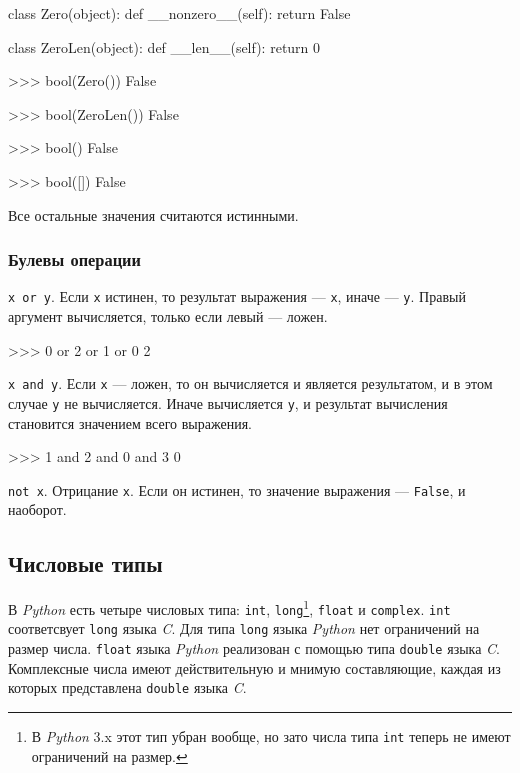 \begin{pylst}{}{}
class Zero(object):
    def __nonzero__(self):
        return False

class ZeroLen(object):
    def __len__(self):
        return 0

>>> bool(Zero())
False

>>> bool(ZeroLen())
False

>>> bool({})
False

>>> bool([])
False
\end{pylst}

Все остальные значения считаются истинными.

\subsubsection{Булевы операции}

\lstinline{x or y}. Если \lstinline{x} истинен, то результат выражения — \lstinline{x}, иначе — \lstinline{y}. Правый аргумент вычисляется, только если левый — ложен.

\begin{pylst}{}{}
>>> 0 or 2 or 1 or 0
2
\end{pylst}

\lstinline{x and y}. Если \lstinline{x} — ложен, то он вычисляется и является результатом, и в этом случае \lstinline{y} не вычисляется. Иначе вычисляется \lstinline{y}, и результат вычисления становится значением всего выражения.

\begin{pylst}{}{}
>>> 1 and 2 and 0 and 3
0
\end{pylst}

\lstinline{not x}. Отрицание \lstinline{x}. Если он истинен, то значение выражения — \lstinline{False}, и наоборот.

\subsection{Числовые типы}
В \emph{Python} есть четыре числовых типа: \lstinline{int}, \lstinline{long}\footnote{В \emph{Python} 3.x этот тип убран вообще, но зато числа типа \lstinline{int} теперь не имеют ограничений на размер.}, \lstinline{float} и \lstinline{complex}. \lstinline{int} соответсвует \lstinline{long} языка \emph{C}. Для типа \lstinline{long} языка \emph{Python} нет ограничений на размер числа. \lstinline{float} языка \emph{Python} реализован с помощью типа \lstinline{double} языка \emph{C}. Комплексные числа имеют действительную и мнимую составляющие, каждая из которых представлена \lstinline{double} языка \emph{C}.

